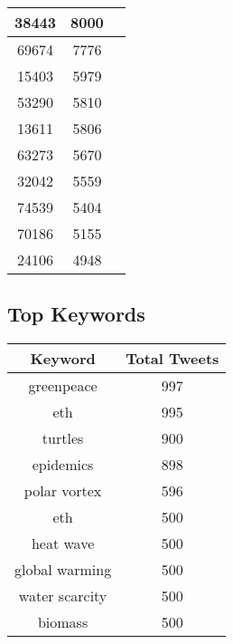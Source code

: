 \documentclass{article}\usepackage[T1]{fontenc}
\begin{document}
\begin{tabular}{|c|c|c|}
 \hline
38443 & 8000\\ 
 \hline
69674 & 7776\\ 
 \hline
15403 & 5979\\ 
 \hline
53290 & 5810\\ 
 \hline
13611 & 5806\\ 
 \hline
63273 & 5670\\ 
 \hline
32042 & 5559\\ 
 \hline
74539 & 5404\\ 
 \hline
70186 & 5155\\ 
 \hline
24106 & 4948\\ 
 \hline
\end{tabular}\subsection*{Top Keywords}\begin{tabular}{|c|c|}         \hline         Keyword & Total Tweets \\ 
 \hline
greenpeace & 997\\ 
 \hline
eth & 995\\ 
 \hline
turtles & 900\\ 
 \hline
epidemics & 898\\ 
 \hline
polar vortex & 596\\ 
 \hline
eth & 500\\ 
 \hline
heat wave & 500\\ 
 \hline
global warming & 500\\ 
 \hline
water scarcity & 500\\ 
 \hline
biomass & 500\\ 
 \hline
\end{tabular}
\end{document}
